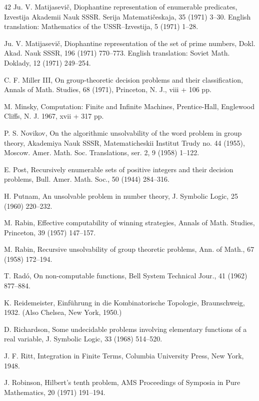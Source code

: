 \documentclass[11pt]{article}
\begin{document}
\begin{thebibliography}{42}
 Ju. V. Matijasevič, Diophantine representation of enumerable predicates, Izvestija Akademii Nauk SSSR. Serija Matematičeskaja, 35 (1971) 3--30. English translation: Mathematics of the USSR--Izvestija, 5 (1971) 1--28.

 Ju. V. Matijasevič, Diophantine representation of the set of prime numbers, Dokl. Akad. Nauk SSSR, 196 (1971) 770--773. English translation: Soviet Math. Doklady, 12 (1971) 249--254.

 C. F. Miller III, On group-theoretic decision problems and their classification, Annals of Math. Studies, 68 (1971), Princeton, N. J., viii + 106 pp.

 M. Minsky, Computation: Finite and Infinite Machines, Prentice-Hall, Englewood Cliffs, N. J. 1967, xvii + 317 pp.

 P. S. Novikov, On the algorithmic unsolvability of the word problem in group theory, Akademiya Nauk SSSR, Matematicheskii Institut Trudy no. 44 (1955), Moscow. Amer. Math. Soc. Translations, ser. 2, 9 (1958) 1--122.

 E. Post, Recursively enumerable sets of positive integers and their decision problems, Bull. Amer. Math. Soc., 50 (1944) 284--316.

 H. Putnam, An unsolvable problem in number theory, J. Symbolic Logic, 25 (1960) 220--232.

 M. Rabin, Effective computability of winning strategies, Annals of Math. Studies, Princeton, 39 (1957) 147--157.

 M. Rabin, Recursive unsolvability of group theoretic problems, Ann. of Math., 67 (1958) 172--194.

 T. Radó, On non-computable functions, Bell System Technical Jour., 41 (1962) 877--884.

 K. Reidemeister, Einführung in die Kombinatorische Topologie, Braunschweig, 1932. (Also Chelsea, New York, 1950.)

 D. Richardson, Some undecidable problems involving elementary functions of a real variable, J. Symbolic Logic, 33 (1968) 514--520.

 J. F. Ritt, Integration in Finite Terms, Columbia University Press, New York, 1948.

 J. Robinson, Hilbert's tenth problem, AMS Proceedings of Symposia in Pure Mathematics, 20 (1971) 191--194.


\end{thebibliography}
\end{document}
